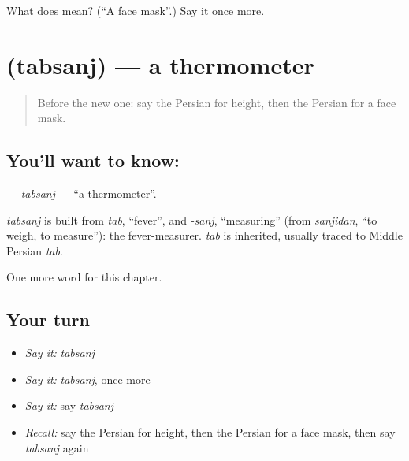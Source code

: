 \begin{tcolorbox}[breakable,colback=teal!4,colframe=teal!35!black,title={Before you move on}]
What does  mean? (\textquotedblleft{}A face mask\textquotedblright{}.) Say it once more.
\end{tcolorbox}
\section[\texorpdfstring{\fa{تب} \fa{سنج} (tabsanj)}{تب سنج (tabsanj)}]{  (tabsanj) — a thermometer}

\label{lesson:FA-C190-tabsanj}



\begin{quote}
Before the new one: say the Persian for height, then the Persian for a face mask.
\end{quote}

\subsection*{You'll want to know:  }
\textbf{ } — \emph{tabsanj} — \textquotedblleft{}a thermometer\textquotedblright{}.

\begin{cousinweb}
\emph{tabsanj} is built from \emph{tab}, \textquotedblleft{}fever\textquotedblright{}, and \emph{-sanj}, \textquotedblleft{}measuring\textquotedblright{} (from \emph{sanjidan}, \textquotedblleft{}to weigh, to measure\textquotedblright{}): the fever-measurer. \emph{tab} is inherited, usually traced to Middle Persian \emph{tab}.
\end{cousinweb}

\begin{grammarlens}[title={What you've built}]
One more word for this chapter.
\end{grammarlens}

\subsection*{Your turn}
\begin{itemize}
\raggedright
  \item \emph{Say it:} \emph{tabsanj}
  \item \emph{Say it:} \emph{tabsanj}, once more
  \item \emph{Say it:} say \emph{tabsanj}
  \item \emph{Recall:} say the Persian for height, then the Persian for a face mask, then say \emph{tabsanj} again
\end{itemize}

